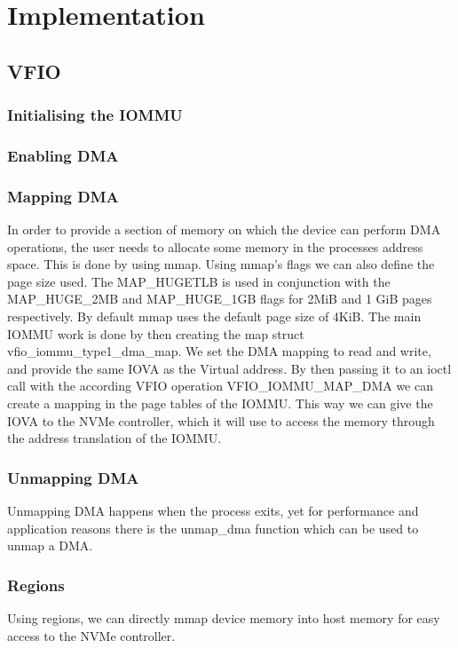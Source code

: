 \chapter{Implementation}

\section{VFIO}

\subsection{Initialising the IOMMU}

\subsection{Enabling DMA}

\subsection{Mapping DMA}
In order to provide a section of memory on which the device can perform DMA operations, the user needs to allocate some memory in the processes address space. This is done by using mmap. Using mmap's flags we can also define the page size used. The MAP\_HUGETLB is used in conjunction with the MAP\_HUGE\_2MB and MAP\_HUGE\_1GB flags for 2MiB and 1 GiB pages respectively. By default mmap uses the default page size of 4KiB.
The main IOMMU work is done by then creating the map struct vfio\_iommu\_type1\_dma\_map. We set the DMA mapping to read and write, and provide the same IOVA as the Virtual address. By then passing it to an ioctl call with the according VFIO operation VFIO\_IOMMU\_MAP\_DMA we can create a mapping in the page tables of the IOMMU. This way we can give the IOVA to the NVMe controller, which it will use to access the memory through the address translation of the IOMMU.

\subsection{Unmapping DMA}
Unmapping DMA happens when the process exits, yet for performance and application reasons there is the unmap\_dma function which can be used to unmap a DMA.

\subsection{Regions}
Using regions, we can directly mmap device memory into host memory for easy access to the NVMe controller.

